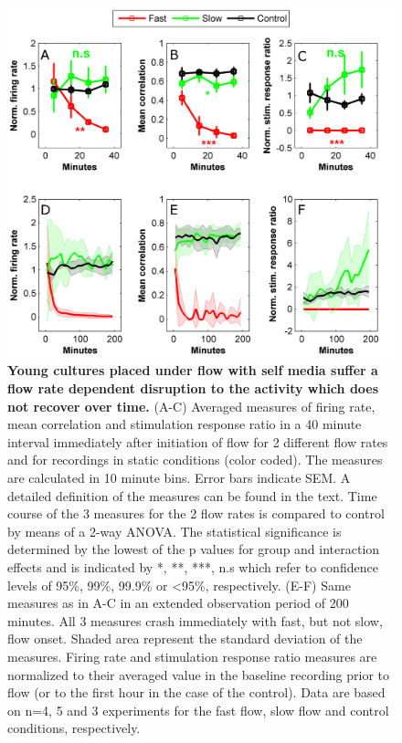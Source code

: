         \begin{figure}[!htb]
            \centering
            \includegraphics[width=15cm]{chapter5/figures/slowFastStats/slowFastStats.jpg}
            \caption[Averaged time course of activity measures in young cultures placed under flow at different rates]{\textbf{Young cultures placed under flow with self media suffer a flow rate dependent disruption to the activity which does not recover over time.} (A-C) Averaged measures of firing rate, mean correlation and stimulation response ratio in a 40 minute interval immediately after initiation of flow for 2 different flow rates and for recordings in static conditions (color coded). The measures are calculated in 10 minute bins. Error bars indicate SEM. A detailed definition of the measures can be found in the text. Time course of the 3 measures for the 2 flow rates is compared to control by means of a 2-way ANOVA. The statistical significance is determined by the lowest of the p values for group and interaction effects and is indicated by *, **, ***, n.s which refer to confidence levels of 95\%, 99\%, 99.9\% or \textless95\%, respectively. (E-F) Same measures as in A-C in an extended observation period of 200 minutes. All 3 measures crash immediately with fast, but not slow, flow onset. Shaded area represent the standard deviation of the measures. Firing rate and stimulation response ratio measures are normalized to their averaged value in the baseline recording prior to flow (or to the first hour in the case of the control). Data are based on n=4, 5 and 3 experiments for the fast flow, slow flow and control conditions, respectively.}
            \label{fig:crossFlow:slowFastStats}
        \end{figure}


